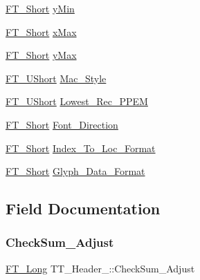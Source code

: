 \begin{DoxyCompactItemize}
\item 
\hyperlink{fttypes_8h_aa7279be89046a2563cd3d4d6651fbdcf}{F\+T\+\_\+\+Short} \hyperlink{struct_t_t___header___ac6aad4966bac8a96c5bc48765b3d694a}{y\+Min}
\item 
\hyperlink{fttypes_8h_aa7279be89046a2563cd3d4d6651fbdcf}{F\+T\+\_\+\+Short} \hyperlink{struct_t_t___header___a593b9cc3e11532972a7fc96944dd1ae9}{x\+Max}
\item 
\hyperlink{fttypes_8h_aa7279be89046a2563cd3d4d6651fbdcf}{F\+T\+\_\+\+Short} \hyperlink{struct_t_t___header___a02d236cd8150c00e886a0c487c04dffa}{y\+Max}
\item 
\hyperlink{fttypes_8h_a937f6c17cf5ffd09086d8610c37b9f58}{F\+T\+\_\+\+U\+Short} \hyperlink{struct_t_t___header___a82f2a5a836b802e44ff712b3afc8745c}{Mac\+\_\+\+Style}
\item 
\hyperlink{fttypes_8h_a937f6c17cf5ffd09086d8610c37b9f58}{F\+T\+\_\+\+U\+Short} \hyperlink{struct_t_t___header___a1d20801c3482dee2529d294441ed9af3}{Lowest\+\_\+\+Rec\+\_\+\+P\+P\+EM}
\item 
\hyperlink{fttypes_8h_aa7279be89046a2563cd3d4d6651fbdcf}{F\+T\+\_\+\+Short} \hyperlink{struct_t_t___header___a1cb7d8a2a76ae1acda3ac94bcd555954}{Font\+\_\+\+Direction}
\item 
\hyperlink{fttypes_8h_aa7279be89046a2563cd3d4d6651fbdcf}{F\+T\+\_\+\+Short} \hyperlink{struct_t_t___header___a05a488607bfae319de096b4bd9cf8c6d}{Index\+\_\+\+To\+\_\+\+Loc\+\_\+\+Format}
\item 
\hyperlink{fttypes_8h_aa7279be89046a2563cd3d4d6651fbdcf}{F\+T\+\_\+\+Short} \hyperlink{struct_t_t___header___adeeedce4bb708c3e068ed80366ec921d}{Glyph\+\_\+\+Data\+\_\+\+Format}
\end{DoxyCompactItemize}


\subsection{Field Documentation}
\mbox{\label{struct_t_t___header___a5ca008fa01e9568769287febc2abd807}} 
\subsubsection{\texorpdfstring{Check\+Sum\+\_\+\+Adjust}{CheckSum\_Adjust}}
{\footnotesize\ttfamily \hyperlink{fttypes_8h_a7fa72a1f0e79fb1860c5965789024d6f}{F\+T\+\_\+\+Long} T\+T\+\_\+\+Header\+\_\+\+::\+Check\+Sum\+\_\+\+Adjust}

